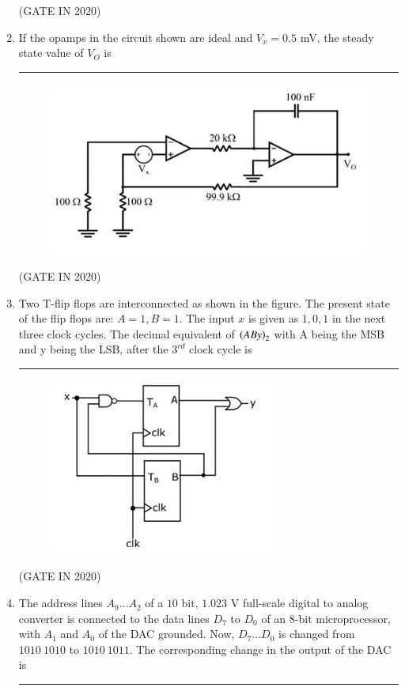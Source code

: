 \documentclass[journal,12pt,onecolumn]{IEEEtran}
\theoremstyle{remark}
\begin{document}
\begin{enumerate}
\hfill{(GATE IN 2020)}

\item If the opamps in the circuit shown are ideal and $V_x = 0.5$ mV, the steady state value of $V_O$  is \rule{2cm}{0.4pt}
\begin{figure}[H]
\centering
\includegraphics[width=0.6\columnwidth]{figs/q18.jpg}
\caption*{}
\label{fig:q18}
\end{figure}

\hfill{(GATE IN 2020)}

\item Two T-flip flops are interconnected as shown in the figure. The present state of the flip flops are: $A = 1, B = 1$. The input $x$ is given as $1, 0, 1$ in the next three clock cycles. The decimal equivalent of $\left(ABy\right)_2$ with A being the MSB and y being the LSB, after the $3^{rd}$ clock cycle is \rule{2cm}{0.4pt}
\begin{figure}[H]
\centering
\includegraphics[width=0.5\columnwidth]{figs/q19.jpg}
\caption*{}
\label{fig:q19}
\end{figure}

\hfill{(GATE IN 2020)}

\item The address lines $A_9 \dots A_2$ of a $10$ bit, $1.023$ V full-scale digital to analog converter  is connected to the data lines $D_7$ to $D_0$ of an 8-bit microprocessor, with $A_1$ and $A_0$ of the DAC grounded. Now, $D_7 \dots D_0$ is changed from $1010~1010$ to $1010~1011$. The corresponding change in the output of the DAC  is \rule{2cm}{0.4pt}


\end{enumerate}
\end{document}
